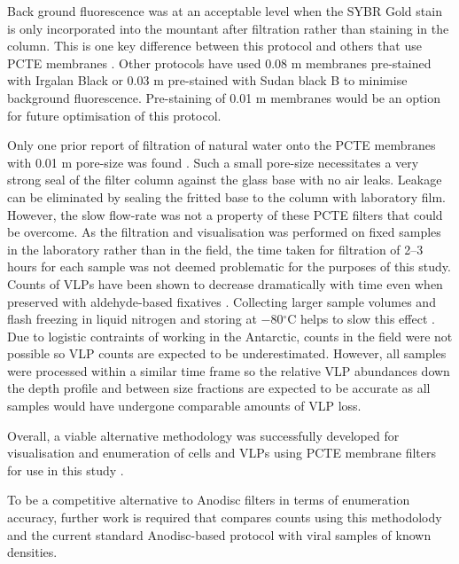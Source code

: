 Back ground fluorescence was at an acceptable level when the SYBR Gold stain is only incorporated into the mountant after filtration rather than staining in the column.
This is one key difference between this protocol and others that use \ac{PCTE} membranes \cite{Hara1991, Proctor1992, Diemer2012}.
Other protocols have used 0.08 \textmu{}m membranes pre-stained with Irgalan Black \cite{Proctor1992} or 0.03 \textmu{}m pre-stained with Sudan black B \cite{Diemer2012} to minimise background fluorescence.
Pre-staining of 0.01 \textmu{}m membranes would be an option for future optimisation of this protocol.

Only one prior report of filtration of natural water onto the \ac{PCTE} membranes with 0.01 \textmu{}m pore-size was found \cite{Hara1991}.
Such a small pore-size necessitates a very strong seal of the filter column against the glass base with no air leaks.
Leakage can be eliminated by sealing the fritted base to the column with laboratory film. 
However, the slow flow-rate was not a property of these \ac{PCTE} filters that could be overcome.
As the filtration and visualisation was performed on fixed samples in the laboratory rather than in the field, the time taken for filtration of 2--3 hours for each sample was not deemed problematic for the purposes of this study.
Counts of \acp{VLP} have been shown to decrease dramatically with time even when preserved with aldehyde-based fixatives \cite{Wen2004}.
Collecting larger sample volumes and flash freezing in liquid nitrogen and storing at $-$80$^{\circ}$C helps to slow this effect \cite{Patel2007}.
Due to logistic contraints of working in the Antarctic, counts in the field were not possible so \ac{VLP} counts are expected to be underestimated.
However, all samples were processed within a similar time frame so the relative \ac{VLP} abundances down the depth profile and between size fractions are expected to be accurate as all samples would have undergone comparable amounts of \ac{VLP} loss. 

Overall, a viable alternative methodology was successfully developed for visualisation and enumeration of cells and \acp{VLP} using \ac{PCTE} membrane filters for use in this study .

To be a competitive alternative to Anodisc filters in terms of enumeration accuracy, further work is required that compares counts using this methodolody and the current standard Anodisc-based protocol \cite{Patel2007} with viral samples of known densities.

